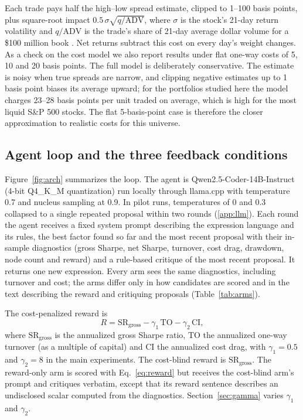 \documentclass[preprint,12pt,authoryear]{elsarticle}
\begin{document}
Each trade pays half the \citet{corwin2012} high--low spread estimate, clipped to 1--100 basis points, plus square-root impact $0.5\,\sigma\sqrt{q/\mathrm{ADV}}$, where $\sigma$ is the stock's 21-day return volatility and $q/\mathrm{ADV}$ is the trade's share of 21-day average dollar volume for a \$100 million book \citep{grinold2000}. Net returns subtract this cost on every day's weight changes. As a check on the cost model we also report results under flat one-way costs of 5, 10 and 20 basis points. The full model is deliberately conservative. The \citet{corwin2012} estimate is noisy when true spreads are narrow, and clipping negative estimates up to 1 basis point biases its average upward; for the portfolios studied here the model charges 23--28 basis points per unit traded on average, which is high for the most liquid S\&P 500 stocks. The flat 5-basis-point case is therefore the closer approximation to realistic costs for this universe.

\subsection{Agent loop and the three feedback conditions}\label{sec:arms}

Figure~\ref{fig:arch} summarizes the loop. The agent is Qwen2.5-Coder-14B-Instruct (4-bit Q4\_K\_M quantization) run locally through llama.cpp with temperature 0.7 and nucleus sampling at 0.9. In pilot runs, temperatures of 0 and 0.3 collapsed to a single repeated proposal within two rounds (\ref{app:llm}). Each round the agent receives a fixed system prompt describing the expression language and its rules, the best factor found so far and the most recent proposal with their in-sample diagnostics (gross Sharpe, net Sharpe, turnover, cost drag, drawdown, node count and reward) and a rule-based critique of the most recent proposal. It returns one new expression. Every arm sees the same diagnostics, including turnover and cost; the arms differ only in how candidates are scored and in the text describing the reward and critiquing proposals (Table~\ref{tab:arms}).

The cost-penalized reward is
\begin{equation}
R = \mathrm{SR}_{\mathrm{gross}} - \gamma_1\,\mathrm{TO} - \gamma_2\,\mathrm{CI},
\label{eq:reward}
\end{equation}
where $\mathrm{SR}_{\mathrm{gross}}$ is the annualized gross Sharpe ratio, $\mathrm{TO}$ the annualized one-way turnover (as a multiple of capital) and $\mathrm{CI}$ the annualized cost drag, with $\gamma_1 = 0.5$ and $\gamma_2 = 8$ in the main experiments. The cost-blind reward is $\mathrm{SR}_{\mathrm{gross}}$. The reward-only arm is scored with Eq.~\eqref{eq:reward} but receives the cost-blind arm's prompt and critiques verbatim, except that its reward sentence describes an undisclosed scalar computed from the diagnostics. Section~\ref{sec:gamma} varies $\gamma_1$ and $\gamma_2$.
\end{document}
